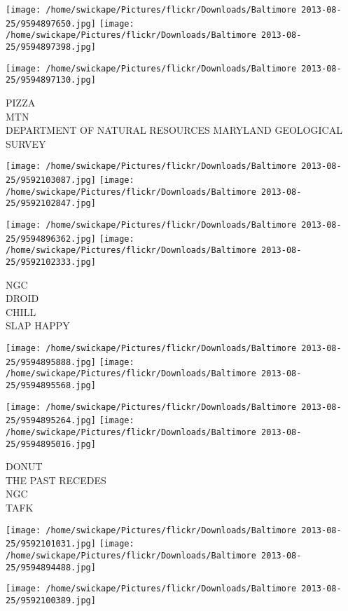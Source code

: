 \documentclass[10pt,letterpaper]{article}
\begin{document}
\texttt{[image: /home/swickape/Pictures/flickr/Downloads/Baltimore 2013-08-25/9594897650.jpg]}
\texttt{[image: /home/swickape/Pictures/flickr/Downloads/Baltimore 2013-08-25/9594897398.jpg]}

\vspace{0.25in}
\texttt{[image: /home/swickape/Pictures/flickr/Downloads/Baltimore 2013-08-25/9594897130.jpg]}

PIZZA\\
MTN\\
DEPARTMENT OF NATURAL RESOURCES MARYLAND GEOLOGICAL SURVEY\\
\pagebreak

\texttt{[image: /home/swickape/Pictures/flickr/Downloads/Baltimore 2013-08-25/9592103087.jpg]}
\texttt{[image: /home/swickape/Pictures/flickr/Downloads/Baltimore 2013-08-25/9592102847.jpg]}

\texttt{[image: /home/swickape/Pictures/flickr/Downloads/Baltimore 2013-08-25/9594896362.jpg]}
\texttt{[image: /home/swickape/Pictures/flickr/Downloads/Baltimore 2013-08-25/9592102333.jpg]}

NGC\\
DROID\\
CHILL\\
SLAP HAPPY\\
\pagebreak

\texttt{[image: /home/swickape/Pictures/flickr/Downloads/Baltimore 2013-08-25/9594895888.jpg]}
\texttt{[image: /home/swickape/Pictures/flickr/Downloads/Baltimore 2013-08-25/9594895568.jpg]}

\texttt{[image: /home/swickape/Pictures/flickr/Downloads/Baltimore 2013-08-25/9594895264.jpg]}
\texttt{[image: /home/swickape/Pictures/flickr/Downloads/Baltimore 2013-08-25/9594895016.jpg]}

DONUT\\
THE PAST RECEDES\\
NGC\\
TAFK\\
\pagebreak

\texttt{[image: /home/swickape/Pictures/flickr/Downloads/Baltimore 2013-08-25/9592101031.jpg]}
\texttt{[image: /home/swickape/Pictures/flickr/Downloads/Baltimore 2013-08-25/9594894488.jpg]}

\texttt{[image: /home/swickape/Pictures/flickr/Downloads/Baltimore 2013-08-25/9592100389.jpg]}
\end{document}
